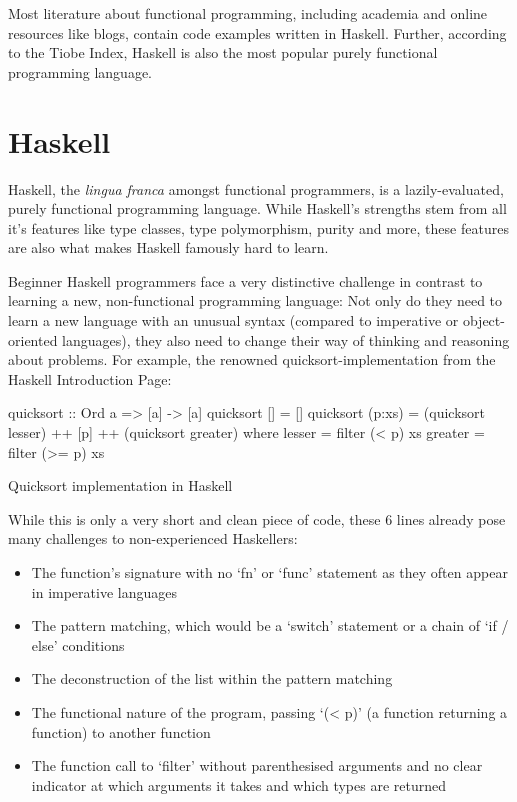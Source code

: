 Most literature about functional programming,
including academia and online resources like blogs, contain code examples written in Haskell.
Further, according to the Tiobe Index\autocite{tiobe-index}, Haskell is also the most popular
purely functional programming language\autocite{comparison-functional-languages}.

\section{Haskell}

Haskell, the \textit{lingua franca} amongst functional programmers, is a lazily-evaluated, purely functional programming
language. While Haskell's strengths stem from all it's features like type classes, type polymorphism, purity and more,
these features are also what makes Haskell famously hard to learn\autocite{haskell-hard-one}\autocite{haskell-hard-two}\autocite{haskell-hard-three}\autocite{haskell-hard-four}.

Beginner Haskell programmers face a very distinctive challenge in contrast to learning a new, non-functional programming language:
Not only do they need to learn a new language with an unusual syntax (compared to imperative or object-oriented languages), they
also need to change their way of thinking and reasoning about problems.
For example, the renowned quicksort-implementation from the Haskell Introduction Page\autocite{haskell-quicksort}:

\begin{listing}
\begin{haskellcode}
quicksort :: Ord a => [a] -> [a]
quicksort []     = []
quicksort (p:xs) = (quicksort lesser) ++ [p] ++ (quicksort greater)
    where
        lesser  = filter (< p) xs
        greater = filter (>= p) xs
\end{haskellcode}
	\caption{Quicksort implementation in Haskell}\label{code:haskell-quicksort}
\end{listing}

While this is only a very short and clean piece of code, these 6 lines already pose many challenges to non-experienced Haskellers:

\begin{itemize}
    \item The function's signature with no `fn' or `func' statement as they often appear in imperative languages
    \item The pattern matching, which would be a `switch' statement or a chain of `if / else' conditions
    \item The deconstruction of the list within the pattern matching
    \item The functional nature of the program, passing `(< p)' (a function returning a function) to another function
    \item The function call to `filter' without parenthesised arguments and no clear indicator at which arguments
        it takes and which types are returned
\end{itemize}

